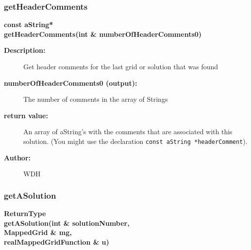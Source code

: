 \subsubsection{getHeaderComments}
 
\begin{flushleft} \textbf{%
const aString*  \\ 
\settowidth{\ShowFileReaderIncludeArgIndent}{getHeaderComments(}%
getHeaderComments(int \& numberOfHeaderComments0)
}\end{flushleft}
\begin{description}
\item[{\bf Description:}] 
   Get header comments for the last grid or solution that was found
\item[{\bf numberOfHeaderComments0 (output):}]  The number of comments in the array of Strings 
\item[{\bf return value:}]  An array of aString's with the comments that are associated
    with this solution. (You might use the declaration {\tt const aString *headerComment}).
\item[{\bf Author:}]  WDH
\end{description}
\subsubsection{getASolution}
 
\begin{flushleft} \textbf{%
ReturnType  \\ 
\settowidth{\ShowFileReaderIncludeArgIndent}{getASolution(}%
getASolution(int \& solutionNumber,\\ 
\hspace{\ShowFileReaderIncludeArgIndent}MappedGrid \& mg,\\ 
\hspace{\ShowFileReaderIncludeArgIndent}realMappedGridFunction \& u)
}\end{flushleft}

